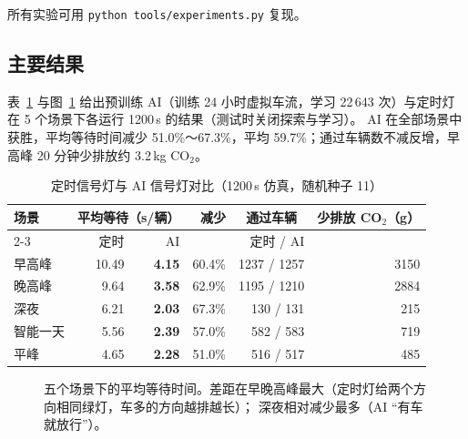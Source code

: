 \documentclass[UTF8,a4paper,zihao=-4,fontset=none]{ctexart}
\begin{document}
所有实验可用 \texttt{python tools/experiments.py} 复现。

\subsection{主要结果}
表~\ref{tab:main} 与图~\ref{fig:main-bar} 给出预训练 AI（训练 24 小时虚拟车流，学习 22\,643 次）与定时灯在 5 个场景下各运行 1200\,s 的结果（测试时关闭探索与学习）。
AI 在全部场景中获胜，平均等待时间减少 51.0\%～67.3\%，平均 59.7\%；通过车辆数不减反增，早高峰 20 分钟少排放约 3.2\,kg CO$_2$。

\begin{table}[h]
\centering\small
\caption{定时信号灯与 AI 信号灯对比（1200\,s 仿真，随机种子 11）}
\label{tab:main}
\begin{tabular}{lrrrrr}
\toprule
\multirow{2}{*}{场景} & \multicolumn{2}{c}{平均等待（s/辆）} & \multirow{2}{*}{减少} & \multicolumn{1}{c}{通过车辆} & \multirow{2}{*}{少排放 CO$_2$（g）}\\
\cmidrule(lr){2-3}
 & 定时 & AI & & 定时 / AI & \\
\midrule
早高峰   & 10.49 & \textbf{4.15} & 60.4\% & 1237 / 1257 & 3150 \\
晚高峰   &  9.64 & \textbf{3.58} & 62.9\% & 1195 / 1210 & 2884 \\
深夜     &  6.21 & \textbf{2.03} & 67.3\% &  130 / 131  &  215 \\
智能一天 &  5.56 & \textbf{2.39} & 57.0\% &  582 / 583  &  719 \\
平峰     &  4.65 & \textbf{2.28} & 51.0\% &  516 / 517  &  485 \\
\bottomrule
\end{tabular}
\end{table}

\begin{figure}[h]
\centering
{}
\caption{五个场景下的平均等待时间。差距在早晚高峰最大（定时灯给两个方向相同绿灯，车多的方向越排越长）；
深夜相对减少最多（AI “有车就放行”）。}
\label{fig:main-bar}
\end{figure}
\end{document}

